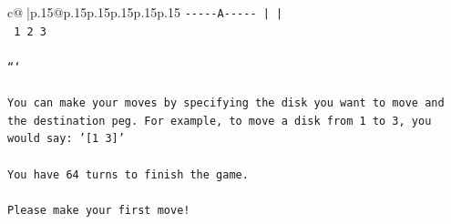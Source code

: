 \documentclass{article}
\begin{document}
{\begin{supertabular}{c@{$\;$}|p{.15\linewidth}@{}p{.15\linewidth}p{.15\linewidth}p{.15\linewidth}p{.15\linewidth}p{.15\linewidth}}
{{{\texttt{{-}{-}{-}{-}{-}A{-}{-}{-}{-}{-}      |           |     } \\
\texttt{     1           2           3     } \\
\\ 
\texttt{```} \\
\\ 
\texttt{You can make your moves by specifying the disk you want to move and the destination peg. For example, to move a disk from 1 to 3, you would say: '{[}1 3{]}'} \\
\\ 
\texttt{You have 64 turns to finish the game.} \\
\\ 
\texttt{Please make your first move!} \\
            }
        }
    }
     \\ \\


\end{supertabular}}
\end{document}
